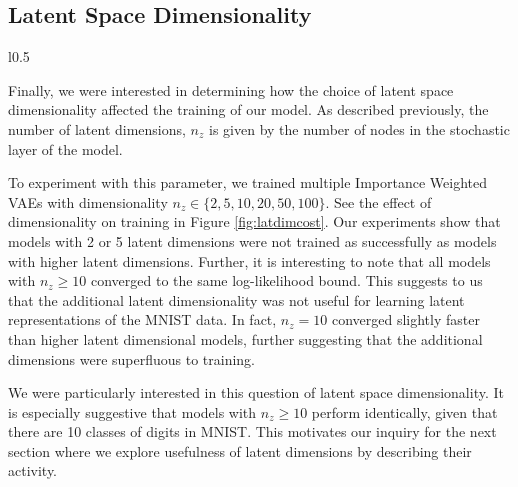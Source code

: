 \documentclass{article} %
\begin{document}
\subsection{Latent Space Dimensionality}
\begin{wrapfigure}{l}{0.5\textwidth}
    \resizebox{\linewidth}{!}{}
    \caption{Latent Dimensionality}
    \label{fig:latdimcost}
\end{wrapfigure}
%
Finally, we were interested in determining how the choice of latent space dimensionality affected the training of our model. As described previously, the number of latent dimensions, $n_z$ is given by the number of nodes in the stochastic layer of the model.
\par To experiment with this parameter, we trained multiple Importance Weighted VAEs with dimensionality ${n_z \in \{2,5,10,20,50,100\}}$. See the effect of dimensionality on training in Figure \ref{fig:latdimcost}. Our experiments show that models with 2 or 5 latent dimensions were not trained as successfully as models with higher latent dimensions. Further, it is interesting to note that all models with $n_z\geq10$ converged to the same log-likelihood bound. This suggests to us that the additional latent dimensionality was not useful for learning latent representations of the MNIST data. In fact, $n_z=10$ converged slightly faster than higher latent dimensional models, further suggesting that the additional dimensions were superfluous to training.
\par We were particularly interested in this question of latent space dimensionality. It is especially suggestive that models with $n_z\geq10$ perform identically, given that there are 10 classes of digits in MNIST. This motivates our inquiry for the next section where we explore usefulness of latent dimensions by describing their activity. 
\end{document}
